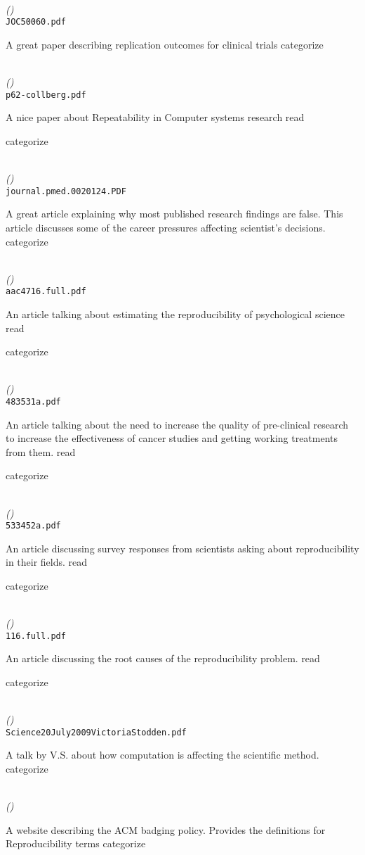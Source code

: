 \documentclass{article}
\newcommand{\Read}{
	\gls{read}
}
\newcommand{\categorize}{
	\gls{categorize}
}
\newenvironment{refdef}[2] {
	\noindent \textbf{\citetitle{#1}} \cite{#1}\\ \citejournalorbooktitle{#1} \textit{(\citeyear{#1})}\\ \texttt{#2} \vspace{0.2in} \par 
} {
\vspace{0.2in}
}
\begin{document}
\begin{refdef}{Ioannidis2005JAMA}{JOC50060.pdf}
A great paper describing replication outcomes for clinical trials \categorize
\end{refdef}

\begin{refdef}{collberg-repeatability-2016}{p62-collberg.pdf}
A nice paper about Repeatability in Computer systems research \Read \categorize
\end{refdef}

\begin{refdef}{Ioannidis2005Pmed}{journal.pmed.0020124.PDF}
A great article explaining why most published research findings are false. This article discusses some of the career pressures affecting scientist's decisions. \categorize
\end{refdef}

\begin{refdef}{aac4716}{aac4716.full.pdf}
An article talking about estimating the reproducibility of psychological science \Read \categorize
\end{refdef}

\begin{refdef}{Begley2012}{483531a.pdf}
An article talking about the need to increase the quality of pre-clinical research to increase the effectiveness of cancer studies and getting working treatments from them. \Read \categorize
\end{refdef}

\begin{refdef}{Baker2016}{533452a.pdf}
An article discussing survey responses from scientists asking about reproducibility in their fields. \Read \categorize
\end{refdef}

\begin{refdef}{Begley116}{116.full.pdf}
An article discussing the root causes of the reproducibility problem. \Read \categorize
\end{refdef}

\begin{refdef}{stodden-computational-science-talk}{Science20July2009VictoriaStodden.pdf}
A talk by V.S. about how computation is affecting the scientific method. \categorize
\end{refdef}

\begin{refdef}{acm-badging}{}
A website describing the ACM badging policy. Provides the definitions for Reproducibility terms \categorize
\end{refdef}
\end{document}
